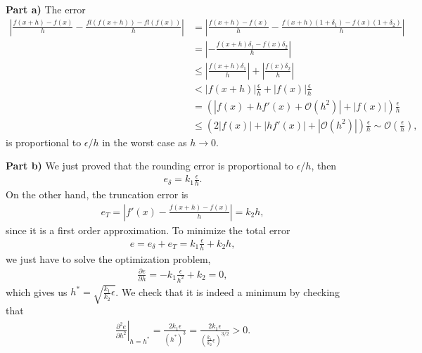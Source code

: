 \begin{solution}
\textbf{Part a) }The error
\begin{align*}
\left|\frac{f(x+h)-f(x)}{h}-\frac{fl(f(x+h))-fl(f(x))}{h}\right|&=\left|\frac{f(x+h)-f(x)}{h}-\frac{f(x+h)(1+\delta_1)-f(x)(1+\delta_2)}{h}\right|\\
&=\left|-\frac{f(x+h)\delta_1-f(x)\delta_2}{h}\right|\\
&\leq\left|\frac{f(x+h)\delta_1}{h}\right|+\left|\frac{f(x)\delta_2}{h}\right|\\
&<\left|f(x+h)\right|\frac{\epsilon}{h}+\left|f(x)\right|\frac{\epsilon}{h}\\
&=\left(\left|f(x)+hf'(x)+\mathcal{O}(h^2)\right|+\left|f(x)\right|\right)\frac{\epsilon}{h}\\
&\leq \left(2\left|f(x)\right|+\left|hf'(x)\right|+\left|\mathcal{O}(h^2)\right|\right)\frac{\epsilon}{h}\sim\mathcal{O}\left(\frac{\epsilon}{h}\right),
\end{align*}
is proportional to $\epsilon/h$ in the worst case as $h\rightarrow 0$.

\textbf{Part b)} We just proved that the rounding error is proportional to $\epsilon/h$, then
\begin{align*}
e_{\delta}=k_1\frac{\epsilon}{h}.
\end{align*}
On the other hand, the truncation error is
\begin{align*}
e_T=\left|f'(x)-\frac{f(x+h)-f(x)}{h}\right|=k_2h,
\end{align*}
since it is a first order approximation. To minimize the total error
\begin{align*}
e=e_{\delta}+e_T=k_1\frac{\epsilon}{h}+k_2h,
\end{align*}
we just have to solve the optimization problem,
\begin{align*}
\frac{\partial e}{\partial h}=-k_1\frac{\epsilon}{h^2}+k_2=0,
\end{align*}
which gives us $h^*=\sqrt{\frac{k_1}{k_2}\epsilon}$. We check that it is indeed a minimum by checking that
\begin{align*}
\left.\frac{\partial^2e}{\partial h^2}\right|_{h=h^*}=\frac{2k_1\epsilon}{(h^*)^3}=\frac{2k_1\epsilon}{\left(\frac{k_1}{k_2}\epsilon\right)^{3/2}}>0.
\end{align*}


\end{solution}
